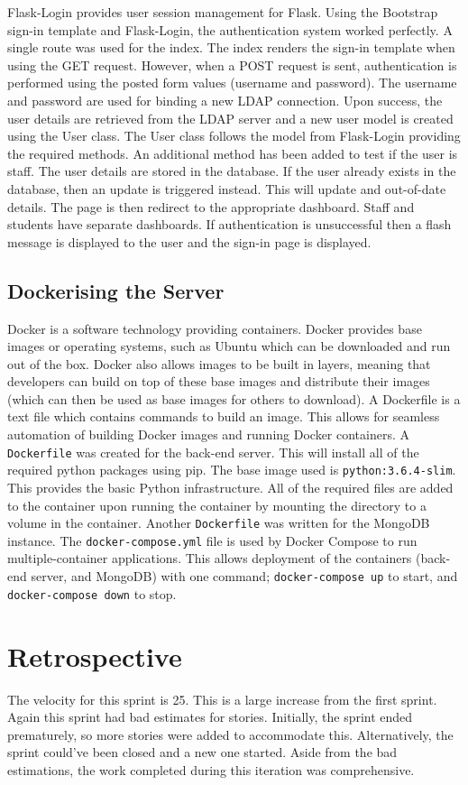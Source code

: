 Flask-Login provides user session management for Flask. Using the Bootstrap sign-in template\cite{BootstrapSignInTemplate} and Flask-Login, the authentication system worked perfectly. A single route was used for the index. The index renders the sign-in template when using the GET request. However, when a POST request is sent, authentication is performed using the posted form values (username and password). The username and password are used for binding a new LDAP connection. Upon success, the user details are retrieved from the LDAP server and a new user model is created using the User class. The User class follows the model from Flask-Login providing the required methods. An additional method has been added to test if the user is staff. The user details are stored in the database. If the user already exists in the database, then an update is triggered instead. This will update and out-of-date details. The page is then redirect to the appropriate dashboard. Staff and students have separate dashboards. If authentication is unsuccessful then a flash message is displayed to the user and the sign-in page is displayed.

\subsection{Dockerising the Server}
Docker is a software technology providing containers. Docker provides base images or operating systems, such as Ubuntu which can be downloaded and run out of the box. Docker also allows images to be built in layers, meaning that developers can build on top of these base images and distribute their images (which can then be used as base images for others to download). A Dockerfile is a text file which contains commands to build an image. This allows for seamless automation of building Docker images and running Docker containers. A \texttt{Dockerfile} was created for the back-end server. This will install all of the required python packages using pip. The base image used is \texttt{python:3.6.4-slim}. This provides the basic Python infrastructure. All of the required files are added to the container upon running the container by mounting the directory to a volume in the container. Another \texttt{Dockerfile} was written for the MongoDB instance. The \texttt{docker-compose.yml} file is used by Docker Compose to run multiple-container applications. This allows deployment of the containers (back-end server, and MongoDB) with one command; \texttt{docker-compose up} to start, and \texttt{docker-compose down} to stop.

\section{Retrospective}
The velocity for this sprint is 25. This is a large increase from the first sprint. Again this sprint had bad estimates for stories. Initially, the sprint ended prematurely, so more stories were added to accommodate this. Alternatively, the sprint could've been closed and a new one started. Aside from the bad estimations, the work completed during this iteration was comprehensive.
